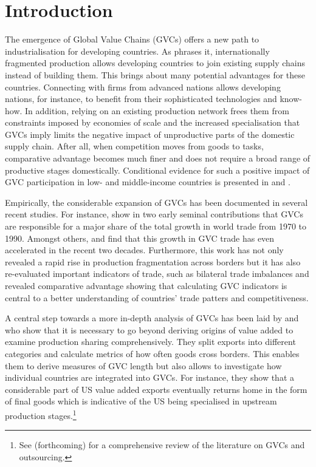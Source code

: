 \documentclass[11pt,a4paper]{article}
\begin{document}
\section{Introduction}
The emergence of Global Value Chains (GVCs) offers a new path to industrialisation for developing countries. As \cite{riba12} phrases it, internationally fragmented production allows developing countries to join existing supply chains instead of building them. This brings about many potential advantages for these countries. Connecting with firms from advanced nations allows developing nations, for instance, to benefit from their sophisticated technologies and know-how. In addition, relying on an existing production network frees them from constraints imposed by economies of scale and the increased specialisation that GVCs imply limits the negative impact of unproductive parts of the domestic supply chain. After all, when competition moves from goods to tasks, comparative advantage becomes much finer and does not require a broad range of productive stages domestically. Conditional evidence for such a positive impact of GVC participation in low- and middle-income countries is presented in \citet{viku16} and \citet{unct13}.

Empirically, the considerable expansion of GVCs has been documented in several recent studies. For instance, \citet{dahuetal98, dahuetal01} show in two early seminal contributions that GVCs are responsible for a major share of the total growth in world trade from 1970 to 1990. Amongst others, \citet{rojoguno12a} and \citet{ribajalo13} find that this growth in GVC trade has even accelerated in the recent two decades. Furthermore, this work has not only revealed a rapid rise in production fragmentation across borders but it has also re-evaluated important indicators of trade, such as bilateral trade imbalances and revealed comparative advantage showing that calculating GVC indicators is central to a better understanding of countries' trade patters and competitiveness. 

A central step towards a more in-depth analysis of GVCs has been laid by \citet{rokoetal14} and \citet{zhwaetal13} who show that it is necessary to go beyond deriving origins of value added to examine production sharing comprehensively. They split exports into different categories and calculate metrics of how often goods cross borders. This enables them to derive measures of GVC length but also allows to investigate how individual countries are integrated into GVCs. For instance, they show that a considerable part of US value added exports eventually returns home in the form of final goods which is indicative of the US being specialised in upstream production stages.\footnote{See \citeauthor{joamsoca15} (forthcoming) for a comprehensive review of the literature on GVCs and outsourcing.} 
\end{document}
